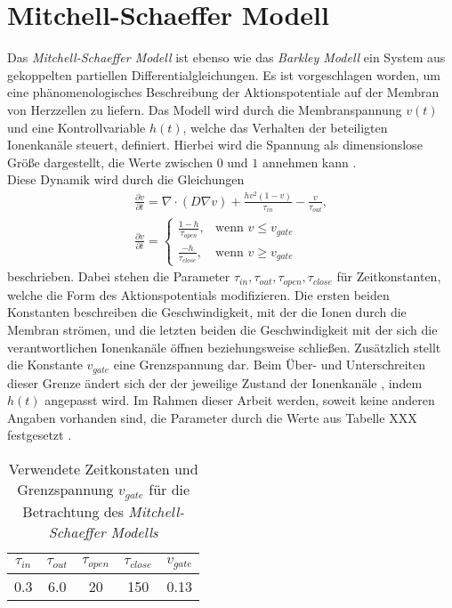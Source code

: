 \section{Mitchell-Schaeffer Modell}
Das \textit{Mitchell-Schaeffer Modell} ist ebenso wie das \textit{Barkley Modell} ein System aus gekoppelten partiellen Differentialgleichungen. Es ist vorgeschlagen worden, um eine phänomenologisches Beschreibung der Aktionspotentiale auf der Membran von Herzzellen zu liefern. Das Modell wird durch die Membranspannung $v(t)$ und eine Kontrollvariable $h(t)$, welche das Verhalten der beteiligten Ionenkanäle steuert, definiert. Hierbei wird die Spannung als dimensionslose Größe dargestellt, die Werte zwischen $0$ und $1$ annehmen kann \citep{mitchell2003two}.\\

Diese Dynamik wird durch die Gleichungen 
\begin{equation}
\begin{gathered}
\frac{\partial v}{\partial t} = \nabla \cdot (D \nabla v) + \frac{h v^2(1-v)}{\tau_{in}} - \frac{v}{\tau_{out}},\\
\frac{\partial v}{\partial t} =
\begin{cases}
	\frac{1-h}{\tau_{open}},& \text{wenn } v \leq v_{gate}\\
    \frac{-h}{\tau_{close}},& \text{wenn } v \geq v_{gate}
\end{cases}
\end{gathered}
\end{equation}
beschrieben. Dabei stehen die Parameter $\tau_{in}, \tau_{out}, \tau_{open}, \tau_{close}$ für Zeitkonstanten, welche die Form des Aktionspotentials modifizieren. Die ersten beiden Konstanten beschreiben die Geschwindigkeit, mit der die Ionen durch die Membran strömen, und die letzten beiden die Geschwindigkeit mit der sich die verantwortlichen Ionenkanäle öffnen beziehungsweise schließen. Zusätzlich stellt die Konstante $v_{gate}$ eine Grenzspannung dar. Beim Über- und Unterschreiten dieser Grenze ändert sich der der jeweilige Zustand der Ionenkanäle , indem $h(t)$ angepasst wird. Im Rahmen dieser Arbeit werden, soweit keine anderen Angaben vorhanden sind, die Parameter durch die Werte aus Tabelle XXX festgesetzt \citep{mitchell2003two}.\\

\begin{table}[H]
\centering
\begin{tabular}{|c|c|c|c|c|}
$\tau_{in}$ & $\tau_{out}$ & $\tau_{open}$ & $\tau_{close}$ & $v_{gate}$ \\ 
\hline 
\hline 
0.3 & 6.0 & 20 & 150 & 0.13 \\ 
\hline 
\end{tabular} 
\label{tab:ms_parameters}
\caption{Verwendete Zeitkonstaten und Grenzspannung $v_{gate}$ für die Betrachtung des \textit{Mitchell-Schaeffer Modells}}
\end{table}


